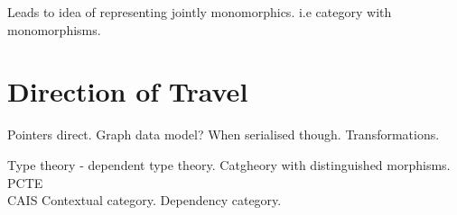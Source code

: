 \documentclass[10pt,a4paper]{article}
\theoremstyle{remark}
\newcommand{\Po}{\ensuremath{\textbf{Po}} }
\begin{document}
Leads to idea of representing jointly monomorphics. i.e category with monomorphisms.

\section{Direction of Travel}
Pointers direct. Graph data model? When serialised though. Transformations.


Type theory - dependent type theory. Catgheory with distinguished morphisms. PCTE\\CAIS Contextual category. Dependency category.
\iffalse
\section*{Data Specification as Presentation of Category with  Monomorphisms}
\section*{Data Specification as Presentation of Category with Products and Monomorphisms}
\section*{Data Specification as Presentation of Category with Limits (and Monomorphisms)}
\section*{Data Specification as Presentation of $\Po$-enriched Category}
\fi
 

\end{document}
